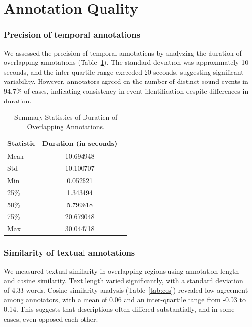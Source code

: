 \documentclass{article}
\begin{document}

\section{Annotation Quality}

\subsubsection{Precision of temporal annotations}
We assessed the precision of temporal annotations by analyzing the duration of overlapping annotations (Table~\ref{tab:dur}). The standard deviation was approximately 10 seconds, and the inter-quartile range exceeded 20 seconds, suggesting significant variability.
However, annotators agreed on the number of distinct sound events in 94.7\% of cases, indicating consistency in event identification despite differences in duration. 

\begin{table}[h]
    \caption{Summary Statistics of Duration of Overlapping Annotations.}
    \label{tab:dur}
    \centering
    \begin{tabular}{lcl}
        \toprule
        Statistic & Duration (in seconds) \\ \midrule
        Mean            & 10.694948 \\
        Std             & 10.100707 \\
        Min             & 0.052521 \\
        25\%            & 1.343494 \\
        50\%            & 5.799818 \\
        75\%            & 20.679048 \\ 
        Max             & 30.044718 \\ \bottomrule
    \end{tabular}
\end{table}


\subsubsection{Similarity of textual annotations}
We measured textual similarity in overlapping regions using annotation length and cosine similarity. Text length varied significantly, with a standard deviation of 4.33 words.
Cosine similarity analysis (Table~\ref{tab:cos}) revealed low agreement among annotators, with a mean of 0.06 and an inter-quartile range from -0.03 to 0.14. This suggests that descriptions often differed substantially, and in some cases, even opposed each other.  
\end{document}
